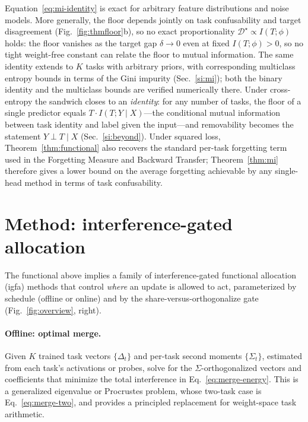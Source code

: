 \documentclass[10pt,a4paper]{article}
\theoremstyle{plain}
\theoremstyle{definition}
\newcommand{\Sig}{\Sigma}
\newcommand{\Del}{\Delta}
\newcommand{\IGFA}{igfa}
\begin{document}
\noindent Equation~\eqref{eq:mi-identity} is exact for arbitrary feature distributions
and noise models. More generally, the floor depends jointly on task confusability and
target disagreement (Fig.~\ref{fig:thmfloor}b), so no exact proportionality
$\mathcal{D}^\star\propto I(T;\phi)$ holds: the floor vanishes as the target gap
$\delta\to0$ even at fixed $I(T;\phi)>0$, so no tight weight-free constant can relate
the floor to mutual information. The same identity extends to $K$ tasks with arbitrary
priors, with corresponding multiclass entropy bounds in terms of the Gini impurity
(Sec.~\ref{si:mi}); both the binary identity and the multiclass bounds are verified
numerically there. Under cross-entropy the sandwich closes to an \emph{identity}: for
any number of tasks, the floor of a single predictor equals $T\cdot I(T;Y\mid X)$---the
conditional mutual information between task identity and label given the input---and
removability becomes the statement $Y\perp T\mid X$
(Sec.~\ref{si:beyond}). Under squared loss,
Theorem~\ref{thm:functional} also recovers the standard per-task forgetting term used
in the Forgetting Measure and Backward Transfer; Theorem~\ref{thm:mi} therefore gives a
lower bound on the average forgetting achievable by any single-head method in terms of
task confusability.

\section{Method: interference-gated allocation}
\label{sec:algo}

The functional above implies a family of interference-gated functional allocation (\IGFA)
methods that control \emph{where} an update is allowed to act, parameterized by
schedule (offline or online) and by the share-versus-orthogonalize gate
(Fig.~\ref{fig:overview}, right).

\paragraph{Offline: optimal merge.} Given $K$ trained task vectors $\{\Del_t\}$ and
per-task second moments $\{\Sig_t\}$, estimated from each task's activations or
probes, solve for the $\Sig$-orthogonalized vectors and coefficients that minimize the
total interference in Eq.~\eqref{eq:merge-energy}. This is a generalized eigenvalue or
Procrustes problem, whose two-task case is Eq.~\eqref{eq:merge-two}, and provides a
principled replacement for weight-space task arithmetic.
\end{document}

